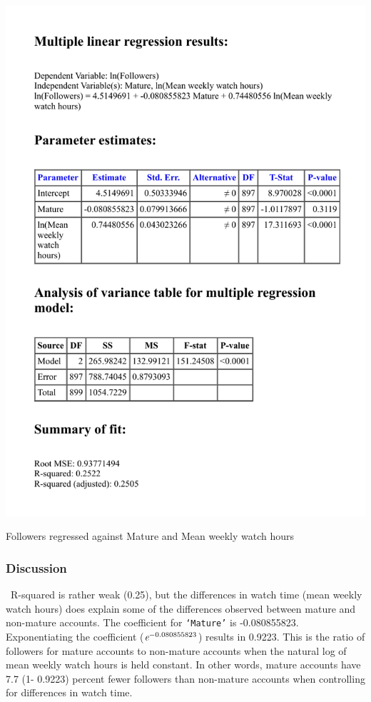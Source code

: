 \documentclass[12pt]{article}
\begin{document}
\begin{table}[H]
  \centering %
  \includegraphics[scale = 0.7]{../StatCrunch_Results/followers_mature_watch_hrs/multi_regression_table}
  \captionsetup{justification=centering, singlelinecheck=false, margin=2cm}
  \caption[Multiple Linear Regression for Followers by Mature]{Followers regressed against Mature and Mean weekly watch hours}
  \label{tab:multi_regression_tab}
\end{table}

\subsubsection{Discussion}\
R-squared is rather weak (0.25), but the differences in watch time (mean weekly watch hours) does explain some of the differences observed between mature and non-mature accounts. The coefficient for \texttt{`Mature'} is -0.080855823. Exponentiating the coefficient ($\emph{e}^{-0.080855823}$) results in 0.9223. This is the ratio of followers for mature accounts to non-mature accounts when the natural log of mean weekly watch hours is held constant. In other words, mature accounts have 7.7 (1- 0.9223) percent fewer followers than non-mature accounts when controlling for differences in watch time.
\end{document}
